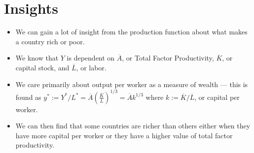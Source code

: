 \documentclass[8pt]{extarticle}
\begin{document}
{\section*{Insights}%
  \begin{itemize}
    \item We can gain a lot of insight from the production function about what makes a country rich or poor.
    \item We know that $Y$ is dependent on $\overline{A}$, or Total Factor Productivity, $\overline{K}$, or capital stock, and $\overline{L}$, or labor.
    \item We care primarily about output per worker as a measure of wealth --- this is found as $y^{*} := Y^{*}/L^{*} = \overline{A}\left(\frac{\overline{K}}{\overline{L}}\right)^{1/3} = \overline{A}k^{1/3}$ where $k:= \overline{K}/\overline{L}$, or capital per worker.
    \item We can then find that some countries are richer than others either when they have more capital per worker or they have a higher value of total factor productivity.
  \end{itemize}
}
\end{document}
